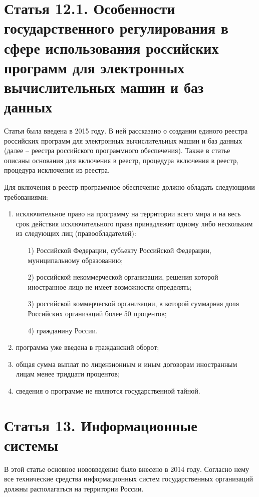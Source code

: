 \section{Статья 12.1. Особенности государственного регулирования в сфере использования российских программ для электронных вычислительных машин и баз данных}

Статья была введена в 2015 году. В ней рассказано о создании единого реестра российских программ для электронных вычислительных машин и баз данных (далее -- реестра российского программного обеспечения). Также в статье описаны основания для включения в реестр, процедура включения в реестр, процедура исключения из реестра.

Для включения в реестр программное обеспечение должно обладать следующими требованиями:

\begin{enumerate}
	\item исключительное право на программу на территории всего мира и на весь срок действия исключительного права принадлежит одному либо нескольким из следующих лиц (правообладателей):
	\begin{enumerate}
		\item[1)] Российской Федерации, субъекту Российской Федерации, муниципальному образованию;
		\item[2)] российской некоммерческой организации, решения которой иностранное лицо не имеет возможности определять;
		\item[3)] российской коммерческой организации, в которой суммарная доля Российских организаций более 50 процентов;
		\item[4)] гражданину России.
	\end{enumerate}
	\item программа уже введена в гражданский оборот;
	\item общая сумма выплат по лицензионным и иным договорам иностранным лицам менее тридцати процентов;
	\item сведения о программе не являются государственной тайной.
\end{enumerate}

\section{Статья 13. Информационные системы}

В этой статье основное нововведение было внесено в 2014 году. Согласно нему все технические средства информационных систем государственных организаций должны располагаться на территории России.

